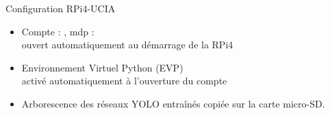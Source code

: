 \documentclass[11pt,serif,mathserif,compress,hyperref={colorlinks}]{beamer}
\begin{document}
\begin{frame}{Configuration RPi4-UCIA}
\begin{tcolorbox}[title={Configuration RPi4-UCIA}, height=68mm]
\begin{itemize}
      \item<6-> Compte : , mdp : \\
        ouvert automatiquement au démarrage de la RPi4
      \item<7-> Environnement Virtuel Python (EVP) \\
        activé automatiquement à l'ouverture du compte 
      \item<8-> Arborescence des réseaux YOLO entraînés copiée sur la carte micro-SD.\\
      \end{itemize}
    
  \end{tcolorbox}
    
\end{frame}
\end{document}
